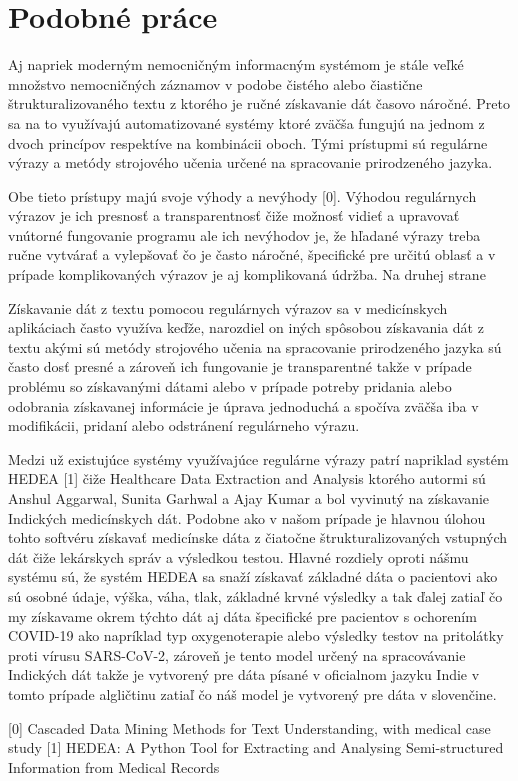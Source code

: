 \chapter{Podobné práce}

Aj napriek moderným nemocničným informacným
systémom je stále veľké množstvo nemocničných záznamov v
podobe čistého alebo čiastične štrukturalizovaného 
textu z ktorého je ručné získavanie dát časovo náročné.
Preto sa na to využívajú automatizované systémy
ktoré zväčša fungujú na jednom z dvoch princípov 
respektíve na kombinácii oboch. Tými prístupmi
sú regulárne výrazy a metódy strojového učenia
určené na spracovanie prirodzeného jazyka.

Obe tieto prístupy majú svoje výhody a nevýhody [0]. 
Výhodou regulárnych výrazov je ich presnosť a 
transparentnosť čiže možnosť vidieť a upravovať
vnútorné fungovanie programu ale ich nevýhodov je,
že hľadané výrazy treba ručne vytvárať a vylepšovať
čo je často náročné, špecifické pre určitú oblasť
a v prípade komplikovaných výrazov je aj komplikovaná
údržba. Na druhej strane 

Získavanie dát z textu pomocou regulárnych výrazov 
sa v medicínskych aplikáciach často využíva keďže,
narozdiel on iných spôsobou získavania dát z textu
akými sú metódy strojového učenia na spracovanie
prirodzeného jazyka sú často dosť presné a zároveň
ich fungovanie je transparentné takže v prípade 
problému so získavanými dátami alebo v prípade 
potreby pridania alebo odobrania získavanej informácie
je úprava jednoduchá a spočíva zväčša iba v modifikácii,
pridaní alebo odstránení regulárneho výrazu. 

Medzi už existujúce systémy využívajúce regulárne
výrazy patrí napriklad systém HEDEA [1] čiže 
Healthcare Data Extraction and Analysis ktorého
autormi sú Anshul Aggarwal, Sunita Garhwal a Ajay Kumar 
a bol vyvinutý na získavanie Indických medicínskych dát.
Podobne ako v našom prípade je hlavnou úlohou tohto 
softvéru získavať medicínske dáta z čiatočne štrukturalizovaných
vstupných dát čiže lekárskych správ a výsledkou testou.
Hlavné rozdiely oproti nášmu systému sú, že systém HEDEA
sa snaží získavať základné dáta o pacientovi ako sú osobné
údaje, výška, váha, tlak, základné krvné výsledky a tak ďalej 
zatiaľ čo my získavame okrem týchto dát aj dáta 
špecifické pre pacientov s ochorením COVID-19 ako
napríklad typ oxygenoterapie alebo výsledky testov
na pritolátky proti vírusu SARS-CoV-2, zároveň
je tento model určený na spracovávanie Indických dát
takže je vytvorený pre dáta písané v oficialnom jazyku
Indie v tomto prípade algličtinu zatiaľ čo náš model
je vytvorený pre dáta v slovenčine.


[0] Cascaded Data Mining Methods for Text Understanding, with medical case study
[1] HEDEA: A Python Tool for Extracting and Analysing Semi-structured Information from Medical Records